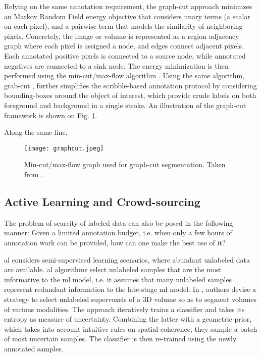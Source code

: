 Relying on the same annotation requirement, the graph-cut approach \cite{Boykov2006}
minimizes an Markov Random Field energy objective that considers unary terms (a scalar on each pixel), and a pairwise term that models the similarity of neighboring pixels.
Concretely, the image or volume is represented as a region adjacency graph where each pixel is assigned a node, and edges connect adjacent pixels.
Each annotated positive pixels is connected to a source node, while annotated negatives are connected to a sink node.
The energy minimization is then performed using the min-cut/max-flow algorithm \cite{goldberg88}.
Using the same algorithm, grab-cut \cite{rother04}, further simplifies the scribble-based annotation protocol by considering bounding-boxes around the object of interest, which provide crude labels on both foreground and background in a single stroke.
An illustration of the graph-cut framework is shown on Fig. \ref{fig:graphcut}.

Along the same line, \cite{criminisi08}

\begin{figure}[!h]
  \centering
  \texttt{[image: graphcut.jpeg]}
  \caption{Min-cut/max-flow graph used for graph-cut segmentation. Taken from \cite{xiao17}.}
  \label{fig:graphcut}
\end{figure}

\subsection{Active Learning and Crowd-sourcing}
The problem of scarcity of labeled data can also be posed in the following manner:
Given a limited annotation budget, i.e. when only a few hours of annotation work can be provided, how can one make the best use of it?

\gls{al} \cite{settles09} considers semi-supervised learning scenarios, where abundant unlabeled data are available.
\gls{al} algorithms select unlabeled samples that are the most informative to the \gls{ml} model, i.e. it assumes that many unlabeled samples represent redundant information to the late-stage \gls{ml} model.
In \cite{KonSznFua15}, authors devise a strategy to select unlabeled supervoxels of a 3D volume so as to segment volumes of various modalities.
The approach iteratively trains a classifier and takes its entropy as measure of uncertainty.
Combining the latter with a geometric prior, which takes into account intuitive rules on spatial coherence, they sample a batch of most uncertain samples.
The classifier is then re-trained using the newly annotated samples.

